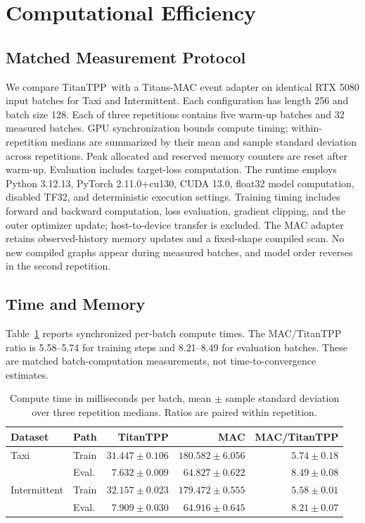 \documentclass[runningheads]{llncs}
\newcommand{\method}{TitanTPP}
\begin{document}
\section{Computational Efficiency}
\subsection{Matched Measurement Protocol}
We compare \method\ with a Titans-MAC event adapter on identical RTX 5080
input batches for Taxi and Intermittent. Each configuration has length 256
and batch size 128. Each of three repetitions contains five warm-up batches
and 32 measured batches. GPU synchronization bounds compute timing;
within-repetition medians are summarized by their mean and sample standard
deviation across repetitions. Peak allocated and reserved memory counters
are reset after warm-up. Evaluation includes target-loss computation. The
runtime employs Python 3.12.13, PyTorch 2.11.0+cu130, CUDA 13.0, float32
model computation, disabled TF32, and deterministic execution settings.
Training timing includes forward and backward computation, loss evaluation,
gradient clipping, and the outer optimizer update; host-to-device transfer
is excluded. The MAC adapter retains observed-history memory updates and
a fixed-shape compiled scan. No new compiled graphs appear during measured
batches, and model order reverses in the second repetition.

\subsection{Time and Memory}
Table~\ref{tab:cost} reports synchronized per-batch compute times. The
MAC/TitanTPP ratio is 5.58--5.74 for training steps and 8.21--8.49 for
evaluation batches. These are matched batch-computation measurements, not
time-to-convergence estimates.

\begin{table}[t]
\caption{Compute time in milliseconds per batch, mean $\pm$ sample
standard deviation over three repetition medians. Ratios are paired within
repetition.}
\label{tab:cost}\centering\small
\begin{tabular}{llrrr}
\toprule
Dataset & Path & TitanTPP & MAC & MAC/TitanTPP\\
\midrule
Taxi & Train & $31.447\pm0.106$ & $180.582\pm6.056$ & $5.74\pm0.18$\\
 & Eval. & $7.632\pm0.009$ & $64.827\pm0.622$ & $8.49\pm0.08$\\
Intermittent & Train & $32.157\pm0.023$ & $179.472\pm0.555$ & $5.58\pm0.01$\\
 & Eval. & $7.909\pm0.030$ & $64.916\pm0.645$ & $8.21\pm0.07$\\
\bottomrule
\end{tabular}
\end{table}
\end{document}
